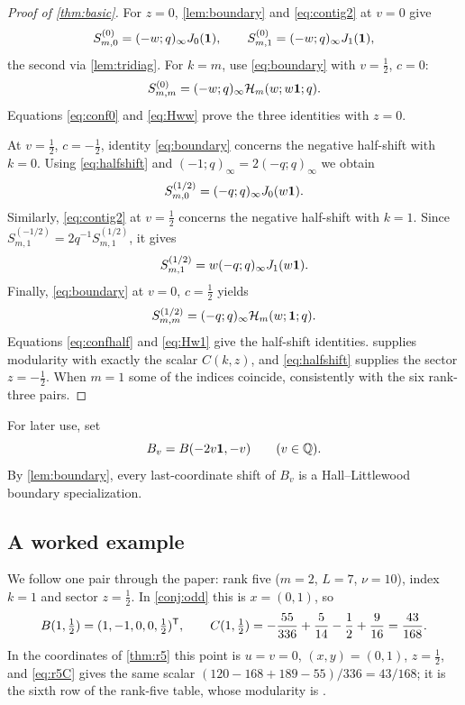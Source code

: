 \begin{proof}[Proof of \cref{thm:basic}]
For $z=0$, \cref{lem:boundary} and \eqref{eq:contig2} at $v=0$ give
\[
S^{(0)}_{m,0}=(-w;q)_\infty J_0(\mathbf{1}),\qquad S^{(0)}_{m,1}=(-w;q)_\infty J_1(\mathbf{1}),
\]
the second via \cref{lem:tridiag}. For $k=m$, use \eqref{eq:boundary} with $v=\frac12$, $c=0$:
\[
S^{(0)}_{m,m}=(-w;q)_\infty\mathcal{H}_m(w;w\mathbf{1};q).
\]
Equations \eqref{eq:conf0} and \eqref{eq:Hww} prove the three identities with $z=0$.

At $v=\frac12$, $c=-\frac12$, identity \eqref{eq:boundary} concerns the negative half-shift with $k=0$. Using \eqref{eq:halfshift} and $(-1;q)_\infty=2(-q;q)_\infty$ we obtain
\[
S^{(1/2)}_{m,0}=(-q;q)_\infty J_0(w\mathbf{1}).
\]
Similarly, \eqref{eq:contig2} at $v=\frac12$ concerns the negative half-shift with $k=1$. Since $S^{(-1/2)}_{m,1}=2q^{-1}S^{(1/2)}_{m,1}$, it gives
\[
S^{(1/2)}_{m,1}=w(-q;q)_\infty J_1(w\mathbf{1}).
\]
Finally, \eqref{eq:boundary} at $v=0$, $c=\frac12$ yields
\[
S^{(1/2)}_{m,m}=(-q;q)_\infty\mathcal{H}_m(w;\mathbf{1};q).
\]
Equations \eqref{eq:confhalf} and \eqref{eq:Hw1} give the half-shift identities.  supplies modularity with exactly the scalar $C(k,z)$, and \eqref{eq:halfshift} supplies the sector $z=-\frac12$. When $m=1$ some of the indices coincide, consistently with the six rank-three pairs.
\end{proof}

For later use, set
\[
B_v=B(-2v\mathbf{1},-v)\qquad(v\in\mathbb{Q}).
\]
By \cref{lem:boundary}, every last-coordinate shift of $B_v$ is a Hall--Littlewood boundary specialization.

\subsection{A worked example}\label{subsec:example}
We follow one pair through the paper: rank five ($m=2$, $L=7$, $\nu=10$), index $k=1$ and sector $z=\frac12$. In \cref{conj:odd} this is $x=(0,1)$, so
\[
B(1,\tfrac12)=(1,-1,0,0,\tfrac12)^{\mathsf{T}},\qquad C(1,\tfrac12)=-\frac{55}{336}+\frac{5}{14}-\frac12+\frac9{16}=\frac{43}{168}.
\]
In the coordinates of \cref{thm:r5} this point is $u=v=0$, $(x,y)=(0,1)$, $z=\frac12$, and \eqref{eq:r5C} gives the same scalar $(120-168+189-55)/336=43/168$; it is the sixth row of the rank-five table, whose modularity is \cite[(5.34)]{SW26}.

